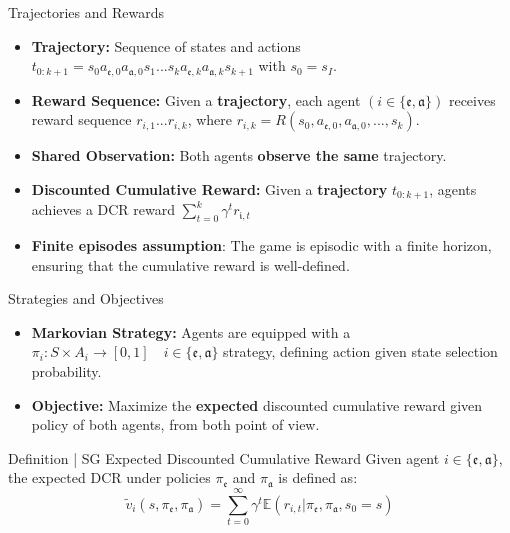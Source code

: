 \documentclass[10pt, aspectratio=169]{beamer}
\newcommand{\evidenzia}[1]{\textcolor{verdeSalvia}{\textbf{#1}}}
\begin{document}
\begin{frame}{Trajectories and Rewards}
    \begin{itemize}
        \item \textbf{Trajectory:} Sequence of states and actions $t_{0:k+1} = s_{0}a_{\mathfrak{e},0}a_{\mathfrak{a},0}s_{1}...s_{k}a_{\mathfrak{e},k}a_{\mathfrak{a},k}s_{k+1}$ with $s_0 = s_{I}$.
        \item \textbf{Reward Sequence:} Given a \evidenzia{trajectory}, each agent $(i \in \{\mathfrak{e}, \mathfrak{a}\})$ receives reward sequence $r_{i,1}...r_{i,k}$, where $r_{i,k} = R(s_{0},a_{\mathfrak{e},0},a_{\mathfrak{a},0},...,s_{k})$.
        \item \textbf{Shared Observation:} Both agents \evidenzia{observe the same} trajectory.
        \item \textbf{Discounted Cumulative Reward:} Given a \evidenzia{trajectory} $t_{0:k+1}$, %
        agents achieves a DCR reward $\sum_{t=0}^{k}\gamma^{t}r_{\mathfrak{i},t}$ %
        \item \textbf{Finite episodes assumption}: The game is episodic with a finite horizon, ensuring that the cumulative reward is well-defined.
    \end{itemize}
\end{frame}

\begin{frame}{Strategies and Objectives}
    \begin{itemize}
        \item \textbf{Markovian Strategy:} Agents are equipped with a $\pi_{i}:S\times A_{i}\rightarrow[0,1]\quad i \in \{\mathfrak{e}, \mathfrak{a}\}$ strategy, defining action given state selection probability. %
        \item \textbf{Objective:} Maximize the \evidenzia{expected} discounted cumulative reward given policy of both agents, from both point of view.%
    \end{itemize}
    \vspace{0.5cm}
        \begin{block}{Definition | SG Expected Discounted Cumulative Reward}%
        Given agent $i \in \{\mathfrak{e}, \mathfrak{a}\}$, the expected DCR under policies $\pi_{\mathfrak{e}}$ and $\pi_{\mathfrak{a}}$ is defined as:
            $$
            \tilde{v}_{i}(s,\pi_{\mathfrak{e}},\pi_{\mathfrak{a}})=\sum_{t=0}^{\infty}\gamma^{t}\mathbb{E}(r_{i,t}|\pi_{\mathfrak{e}},\pi_{\mathfrak{a}},s_{0}=s) 
            $$
        \end{block}
\end{frame}
\end{document}
